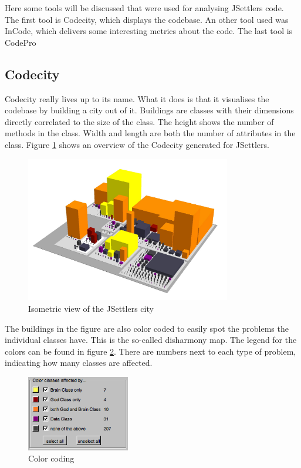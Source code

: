 \documentclass[pdftex12pt, a4paper]{article}
\begin{document}
Here some tools will be discussed that were used for analysing JSettlers code.
The first tool is Codecity, which displays the codebase. An other tool used was InCode, which delivers some interesting metrics about the code.
The last tool is CodePro

\subsection{Codecity}

Codecity really lives up to its name.
What it does is that it visualises the codebase by building a city out of it.
Buildings are classes with their dimensions directly correlated to the size of the class.
The height shows the number of methods in the class.
Width and length are both the number of attributes in the class.
Figure \ref{fig:codecityIso} shows an overview of the Codecity generated for JSettlers.

\begin{figure}
\begin{center}
\includegraphics[width=0.8\textwidth]{Image/Codecity/Codecity2.jpg}
\caption{Isometric view of the JSettlers city}
\label{fig:codecityIso}
\end{center}
\end{figure}

The buildings in the figure are also color coded to easily spot the problems the individual classes have.
This is the so-called disharmony map.
The legend for the colors can be found in figure \ref{fig:legendCodeCity}.
There are numbers next to each type of problem, indicating how many classes are affected.

\begin{figure}
\begin{center}
\includegraphics[width=0.4\textwidth]{Image/Codecity/Codecity4.png}
\caption{Color coding}
\label{fig:legendCodeCity}
\end{center}
\end{figure}
\end{document}
